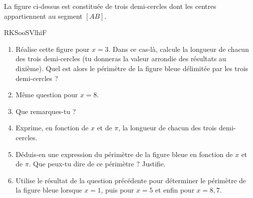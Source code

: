 
\begin{exercice}\label{exosmath-0810}

La figure ci-dessus est constituée de trois demi-cercles dont les centres appartiennent au segment $[AB]$.

RKSooSVlhiF


\begin{enumerate}
    \item
Réalise cette figure pour $x = 3$. Dans ce cas-là, calcule la longueur de chacun des trois demi-cercles (tu donneras la valeur arrondie des résultats au dixième).  Quel est alors le périmètre de la figure bleue délimitée par les trois demi-cercles ?
\item
 Même question pour
 $x = 8$.
 \item
 Que remarques-tu ?
\item
 Exprime, en fonction de $x$ et de \( \pi\), la longueur de chacun des trois demi-cercles.
\item
 Déduis-en une expression du périmètre de la figure bleue en fonction de $x$ et de \( \pi\).  Que peux-tu dire de ce périmètre ? Justifie.
\item
 Utilise le résultat de la question précédente pour déterminer le périmètre de la figure bleue lorsque $x = 1$, puis pour $x = 5$ et enfin pour $x = 8,7$.
\end{enumerate}

\end{exercice}
